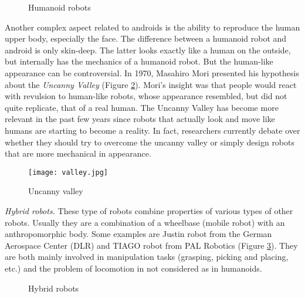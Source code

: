 \begin{figure}[!hbt]
\centering 
{}\hspace{10mm}
\caption{Humanoid robots}
\label{fig:zoo}
\end{figure}


Another complex aspect related to androids is the ability to reproduce the human upper body, especially the face. The difference between a humanoid robot and android is only skin-deep. The latter looks exactly like a human on the outside, but internally has the mechanics of a humanoid robot. But the human-like appearance can be controversial. In 1970, Masahiro Mori presented his hypothesis about the \textit{Uncanny Valley} (Figure \ref{fig:valley}). Mori's insight was that people would react with revulsion to human-like robots, whose appearance resembled, but did not quite replicate, that of a real human. The Uncanny Valley has become more relevant in the past few years since robots that actually look and move like humans are starting to become a reality. In fact, researchers currently debate over whether they should try to overcome the uncanny valley or simply design robots that are more mechanical in appearance.

\begin{figure}[!hbt]
\centering
\texttt{[image: valley.jpg]}
\caption{Uncanny valley}
\label{fig:valley}
\end{figure}


\textit{Hybrid robots.} These type  of robots combine properties of various types of other robots. Usually they are a combination of a wheelbase (mobile robot) with an anthropomorphic body. Some examples are Justin robot from the German Aerospace Center (DLR) and TIAGO robot from PAL Robotics (Figure \ref{fig:hybrid}). They are both mainly involved in manipulation tasks (grasping, picking and placing, etc.) and the problem of locomotion in not considered as in humanoids. 

\begin{figure}[!hbt]
\centering 
{}\hspace{10mm}
\caption{Hybrid robots}
\label{fig:hybrid}
\end{figure}

\newpage



